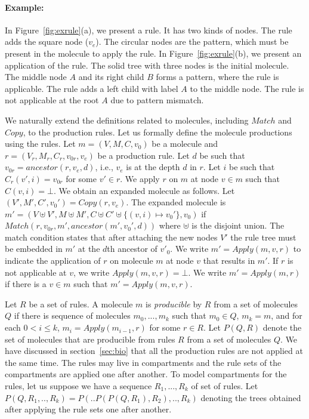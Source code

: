 \paragraph{Example:} In Figure~\ref{fig:exrule}(a), we present a rule. It has
  two kinds of nodes.
  The rule adds the square node ($v_e$).
  The circular nodes %
  are the pattern, which must be present in the molecule to apply the rule.
  In Figure~\ref{fig:exrule}(b), we present an application of the rule.
  The solid tree with three nodes is the initial molecule.
  The middle node $A$ and its right child $B$ forms a pattern, where the rule is applicable.
  The rule adds a left child with label $A$ to the middle node.
  The rule is not applicable at the root $A$ due to pattern mismatch.


We naturally extend the definitions related to molecules, including $Match$ and $Copy$,
to the production rules.
Let us formally define the molecule productions using the rules.
Let $m = (V,M,C,v_0)$ be a molecule and $r = (V_r, M_r, C_r, v_{0r}, v_e)$ be a production rule.
Let $d$ be such that $v_{0r} = ancestor(r,v_e,d)$, i.e., $v_e$ is at the depth $d$ in $r$.
Let $i$ be such that $C_r(v',i) = v_{0r}$ for some $v' \in r$.
We apply $r$ on $m$ at node $v \in m$ such that $C(v,i) = \bot$.
We obtain an expanded molecule as follows.
Let $(V',M',C',v_0') = Copy(r,v_e)$.
The expanded molecule is
$
m' = (V \uplus V', M \uplus M', C \uplus C' \uplus \{(v,i) \mapsto v_0'\}, v_0)
$ if
$Match( r, v_{0r}, m', ancestor(m', v_0', d) )$ where $\uplus$ is the disjoint union.
The match condition states that after attaching the new nodes $V'$
the rule tree must be embedded in $m'$ at the $d$th ancestor of $v'_0$. 
We write $m' = Apply(m, v, r)$ to indicate the application of $r$
on molecule $m$ at node $v$ that results in $m'$.
If $r$ is not applicable at $v$, we write $Apply(m, v, r) = \bot$.
We write $m' = Apply(m, r)$ if there is a $v \in m$ such that
$m' = Apply(m,v,r)$.

Let $R$ be a set of rules.
A molecule $m$ is {\em producible} by $R$ from a set of molecules $Q$
if there is sequence of molecules $m_0,...,m_k$
such that $m_0 \in Q$, $m_k=m$, and
for each $0<i\leq k$, $m_{i} = Apply(m_{i-1},r)$ for some $r \in R$.
Let $P(Q,R)$ denote the set of molecules that are producible from
rules $R$ from a set of molecules $Q$.
We have discussed in section~\ref{sec:bio} that all the production rules
are not applied at the same time.
The rules may live in compartments and
the rule sets of the compartments are applied one after another.
To model compartments for the rules,
let us suppose we have a sequence $R_1,...,R_k$ of set of rules.
Let $P(Q, R_1,..,R_k) = P(..P(P(Q,R_1),R_2),..,R_k)$ denoting the
trees obtained after applying the rule sets one after another.

